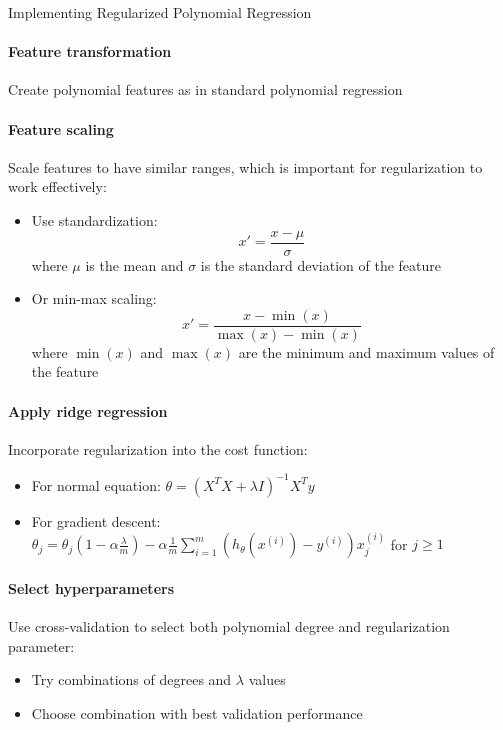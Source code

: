 \begin{KR}{Implementing Regularized Polynomial Regression}
\paragraph{Feature transformation}
Create polynomial features as in standard polynomial regression

\paragraph{Feature scaling}
Scale features to have similar ranges, which is important for regularization to work effectively:
\begin{itemize}
    \item Use standardization: $$x' = \frac{x - \mu}{\sigma}$$ 
    where $\mu$ is the mean and $\sigma$ is the standard deviation of the feature
    \item Or min-max scaling: $$x' = \frac{x - \min(x)}{\max(x) - \min(x)}$$
    where $\min(x)$ and $\max(x)$ are the minimum and maximum values of the feature
\end{itemize}

\paragraph{Apply ridge regression}
Incorporate regularization into the cost function:
\begin{itemize}
    \item For normal equation: $\theta = (X^T X + \lambda I)^{-1}X^T y$
    \item For gradient descent: $\theta_j = \theta_j(1-\alpha\frac{\lambda}{m}) - \alpha\frac{1}{m}\sum_{i=1}^{m}(h_\theta(x^{(i)}) - y^{(i)})x^{(i)}_j$ for $j \geq 1$
\end{itemize}

\paragraph{Select hyperparameters}
Use cross-validation to select both polynomial degree and regularization parameter:
\begin{itemize}
    \item Try combinations of degrees and $\lambda$ values
    \item Choose combination with best validation performance
\end{itemize}
\end{KR}

